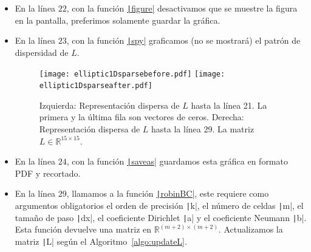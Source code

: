 \begin{problem}
\begin{itemize}
  \item

        En la línea $22$, con la función
        \href{https://docs.octave.org/v9.3.0/Figure-Properties.html#index-figure-visible}{\texttt|figure|}
        desactivamos que se muestre la figura en la pantalla,
        preferimos solamente guardar la gráfica.

  \item

        En la línea $23$, con la función
        \href{https://docs.octave.org/latest/Information.html#index-spy}{\texttt|spy|}
        graficamos (no se mostrará) el patrón de dispersidad de
        $L$.

        \begin{figure}[ht!]
          \centering
          \texttt{[image: elliptic1Dsparsebefore.pdf]}
          \texttt{[image: elliptic1Dsparseafter.pdf]}
          \caption{Izquierda: Representación dispersa de $L$ hasta la línea
            21.
            La primera y la última fila son vectores de ceros.
            Derecha: Representación dispersa de $L$ hasta la línea 29.
            La matriz $L\in\mathbb{R}^{15\times 15}$.}
        \end{figure}

  \item

        En la línea $24$, con la función
        \href{https://docs.octave.org/latest/Printing-and-Saving-Plots.html}{\texttt|saveas|}
        guardamos esta gráfica en formato PDF y recortado.

  \item

        En la línea $29$, llamamos a la función
        \href{https://carlosal1015.github.io/mole_examples/api_docs/matlab/src/matlab/robinBC.html}{\texttt|robinBC|},
        este requiere como argumentos obligatorios el orden de
        precisión \texttt|k|, el número  de celdas
        \texttt|m|, el tamaño de paso
        \texttt|dx|, el coeficiente Dirichlet
        \texttt|a| y el coeficiente Neumann
        \texttt|b|.
        Esta función devuelve una matriz en
        \begin{math}
          \mathbb{R}^{\left(m+2\right)\times\left(m+2\right)}
        \end{math}.
        Actualizamos la matriz \texttt|L| según el
        Algoritmo~\ref{algo:updateL}.


\end{itemize}
\end{problem}
